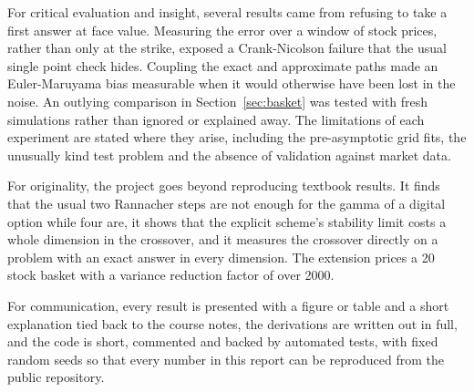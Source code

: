\documentclass[11pt,a4paper]{article}
\begin{document}
For critical evaluation and insight, several results came from refusing to take a first answer at face value. Measuring the error over a window of stock prices, rather than only at the strike, exposed a Crank-Nicolson failure that the usual single point check hides. Coupling the exact and approximate paths made an Euler-Maruyama bias measurable when it would otherwise have been lost in the noise. An outlying comparison in Section~\ref{sec:basket} was tested with fresh simulations rather than ignored or explained away. The limitations of each experiment are stated where they arise, including the pre-asymptotic grid fits, the unusually kind test problem and the absence of validation against market data.

For originality, the project goes beyond reproducing textbook results. It finds that the usual two Rannacher steps are not enough for the gamma of a digital option while four are, it shows that the explicit scheme's stability limit costs a whole dimension in the crossover, and it measures the crossover directly on a problem with an exact answer in every dimension. The extension prices a 20 stock basket with a variance reduction factor of over 2000.

For communication, every result is presented with a figure or table and a short explanation tied back to the course notes, the derivations are written out in full, and the code is short, commented and backed by automated tests, with fixed random seeds so that every number in this report can be reproduced from the public repository.
\end{document}
